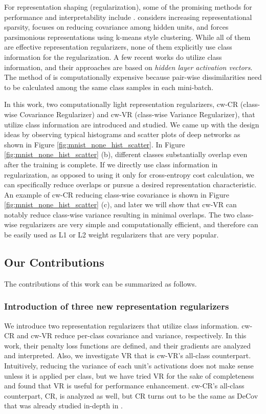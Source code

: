 \documentclass[letterpaper]{article} %
\begin{document}
For representation shaping (regularization), some of the promising methods for performance and interpretability include \cite{glorot2011deep,cogswell2015reducing,liao2016learning}.
\cite{glorot2011deep} considers increasing representational sparsity, \cite{cogswell2015reducing} focuses on reducing covariance among hidden units, and \cite{liao2016learning} forces parsimonious representations using k-means style clustering. While all of them are effective representation regularizers, none of them explicitly use class information for the regularization. A few recent works \cite{wen2016discriminative,belharbi2017neural,yang2018robust} do utilize class information, and their approaches are based on \textit{hidden layer activation vectors}. The method of \cite{belharbi2017neural} is computationally expensive because pair-wise dissimilarities need to be calculated among the same class samples in each mini-batch. 

In this work, two computationally light representation regularizers, cw-CR (class-wise Covariance Regularizer) and cw-VR (class-wise Variance Regularizer), that utilize class information are introduced and studied. We came up with the design ideas by observing typical histograms and scatter plots of deep networks as shown in Figure \ref{fig:mnist_none_hist_scatter}. In Figure \ref{fig:mnist_none_hist_scatter} (b), different classes substantially overlap even after the training is complete. If we directly use class information in regularization, as opposed to using it only for cross-entropy cost calculation, we can specifically reduce overlaps or pursue a desired representation characteristic. An example of cw-CR reducing class-wise covariance is shown in Figure \ref{fig:mnist_none_hist_scatter} (c), and later we will show that cw-VR can notably reduce class-wise variance resulting in minimal overlaps. The two class-wise regularizers are very simple and computationally efficient, and therefore can be easily used as L1 or L2 weight regularizers that are very popular. 

\subsection{Our Contributions}
The contributions of this work can be summarized as follows.

\subsubsection{Introduction of three new representation regularizers} 
We introduce two representation regularizers that utilize class information. cw-CR and cw-VR reduce per-class covariance and variance, respectively. In this work, their penalty loss functions are defined, and their gradients are analyzed and interpreted. Also, we investigate VR that is cw-VR's all-class counterpart. Intuitively, reducing the variance of each unit's activations does not make sense unless it is applied per class, but we have tried VR for the sake of completeness and found that VR is useful for performance enhancement. cw-CR's all-class counterpart, CR, is analyzed as well, but CR turns out to be the same as DeCov that was already studied in-depth in \cite{cogswell2015reducing}. 
\end{document}
